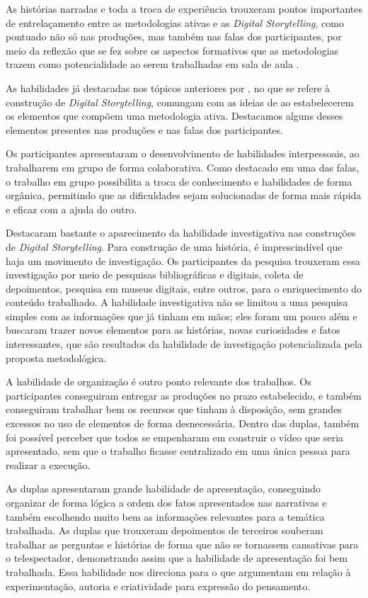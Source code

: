 \documentclass[portuguese]{textolivre}
\begin{document}
As histórias narradas e toda a troca de experiência trouxeram pontos importantes de entrelaçamento entre as metodologias ativas e as \textit{Digital Storytelling}, como pontuado não só nas produções, mas também nas falas dos participantes, por meio da reflexão que se fez sobre os aspectos formativos que as metodologias trazem como potencialidade ao serem trabalhadas em sala de aula \cite{pasinato2023educacao,moura2023narrativa}.

As habilidades já destacadas nos tópicos anteriores por \textcite{robin2006usos}, no que se refere à construção de \textit{Digital Storytelling}, comungam com as ideias de \textcite[p.~146]{farias2015aprendizagem} ao estabelecerem os elementos que compõem uma metodologia ativa. Destacamos alguns desses elementos presentes nas produções e nas falas dos participantes.

Os participantes apresentaram o desenvolvimento de habilidades interpessoais, ao trabalharem em grupo de forma colaborativa. Como destacado em uma das falas, o trabalho em grupo possibilita a troca de conhecimento e habilidades de forma orgânica, permitindo que as dificuldades sejam solucionadas de forma mais rápida e eficaz com a ajuda do outro.

Destacaram bastante o aparecimento da habilidade investigativa nas construções de \textit{Digital Storytelling}. Para construção de uma história, é imprescindível que haja um movimento de investigação. Os participantes da pesquisa trouxeram essa investigação por meio de pesquisas bibliográficas e digitais, coleta de depoimentos, pesquisa em museus digitais, entre outros, para o enriquecimento do conteúdo trabalhado. A habilidade investigativa não se limitou a uma pesquisa simples com as informações que já tinham em mãos; eles foram um pouco além e buscaram trazer novos elementos para as histórias, novas curiosidades e fatos interessantes, que são resultados da habilidade de investigação potencializada pela proposta metodológica.

A habilidade de organização é outro ponto relevante dos trabalhos. Os participantes conseguiram entregar as produções no prazo estabelecido, e também conseguiram trabalhar bem os recursos que tinham à disposição, sem grandes excessos no uso de elementos de forma desnecessária. Dentro das duplas, também foi possível perceber que todos se empenharam em construir o vídeo que seria apresentado, sem que o trabalho ficasse centralizado em uma única pessoa para realizar a execução.

As duplas apresentaram grande habilidade de apresentação, conseguindo organizar de forma lógica a ordem dos fatos apresentados nas narrativas e também escolhendo muito bem as informações relevantes para a temática trabalhada. As duplas que trouxeram depoimentos de terceiros souberam trabalhar as perguntas e histórias de forma que não se tornassem cansativas para o telespectador, demonstrando assim que a habilidade de apresentação foi bem trabalhada. Essa habilidade nos direciona para o que argumentam \textcite{rodrigues2023para} em relação à experimentação, autoria e criatividade para expressão do pensamento.
\end{document}
